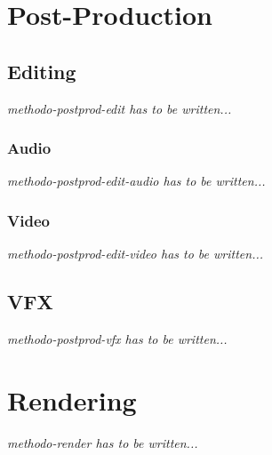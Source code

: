 \documentclass[letterpaper, openright]{report}
\begin{document}
    \section{Post-Production} %
	\label{sub:methodo-postprod} 

            \subsection{Editing} %
			\label{subsub:methodo-postprod-edit}
\textit{methodo-postprod-edit has to be written...}

				\subsubsection{Audio} %
				\label{subsub:methodo-postprod-edit-audio}
\textit{methodo-postprod-edit-audio has to be written...}
            
            	\subsubsection{Video} %
				\label{subsub:methodo-postprod-video}
\textit{methodo-postprod-edit-video has to be written...}
            
            \subsection{\ac{VFX}} %
			\label{subsub:methodo-postprod-vfx}
\textit{methodo-postprod-vfx has to be written...}

    
        \section{Rendering} %
		\label{subsub:methodo-render}
\textit{methodo-render has to be written...}

    
\end{document}
